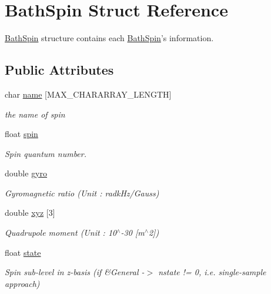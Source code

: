\hypertarget{structBathSpin}{\section{Bath\-Spin Struct Reference}
\label{structBathSpin}
}


\hyperlink{structBathSpin}{Bath\-Spin} structure contains each \hyperlink{structBathSpin}{Bath\-Spin}'s information.  


\subsection*{Public Attributes}
\begin{DoxyCompactItemize}
\item 
char \hyperlink{structBathSpin_a2158c37aefcd8093520106945f5f7463}{name} \mbox{[}M\-A\-X\-\_\-\-C\-H\-A\-R\-A\-R\-R\-A\-Y\-\_\-\-L\-E\-N\-G\-T\-H\mbox{]}
\begin{DoxyCompactList}\small\item\em the name of spin \end{DoxyCompactList}\item 
float \hyperlink{structBathSpin_a0738a356e1f78530032d8bc8de02fbd8}{spin}
\begin{DoxyCompactList}\small\item\em Spin quantum number. \end{DoxyCompactList}\item 
double \hyperlink{structBathSpin_a8c6487e73c2ef39b7a12d293ff5a1e4d}{gyro}
\begin{DoxyCompactList}\small\item\em Gyromagnetic ratio (Unit \-: radk\-Hz/\-Gauss) \end{DoxyCompactList}\item 
double \hyperlink{structBathSpin_ae88f65d01b379916181269efa6c33e8a}{xyz} \mbox{[}3\mbox{]}
\begin{DoxyCompactList}\small\item\em Quadrupole moment (Unit \-: 10$^\wedge$-\/30 \mbox{[}m$^\wedge$2\mbox{]}) \end{DoxyCompactList}\item 
float \hyperlink{structBathSpin_a6348f965fe820b03094f4c620ab7ffe0}{state}
\begin{DoxyCompactList}\small\item\em Spin sub-\/level in z-\/basis (if \&General -\/$>$ nstate != 0, i.\-e. single-\/sample approach) \end{DoxyCompactList}\item 

\end{DoxyCompactItemize}
